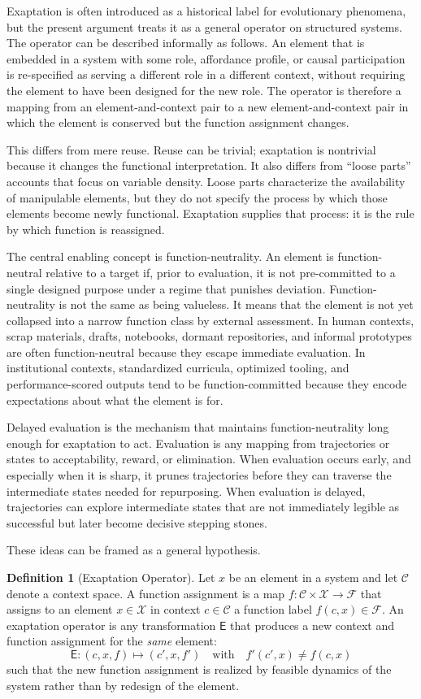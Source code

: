 \documentclass[11pt]{article}
\theoremstyle{definition}
\newtheorem{definition}{Definition}
\begin{document}
Exaptation is often introduced as a historical label for evolutionary phenomena, but the present argument treats it as a general operator on structured systems. The operator can be described informally as follows. An element that is embedded in a system with some role, affordance profile, or causal participation is re-specified as serving a different role in a different context, without requiring the element to have been designed for the new role. The operator is therefore a mapping from an element-and-context pair to a new element-and-context pair in which the element is conserved but the function assignment changes.

This differs from mere reuse. Reuse can be trivial; exaptation is nontrivial because it changes the functional interpretation. It also differs from ``loose parts'' accounts that focus on variable density. Loose parts characterize the availability of manipulable elements, but they do not specify the process by which those elements become newly functional. Exaptation supplies that process: it is the rule by which function is reassigned.

The central enabling concept is function-neutrality. An element is function-neutral relative to a target if, prior to evaluation, it is not pre-committed to a single designed purpose under a regime that punishes deviation. Function-neutrality is not the same as being valueless. It means that the element is not yet collapsed into a narrow function class by external assessment. In human contexts, scrap materials, drafts, notebooks, dormant repositories, and informal prototypes are often function-neutral because they escape immediate evaluation. In institutional contexts, standardized curricula, optimized tooling, and performance-scored outputs tend to be function-committed because they encode expectations about what the element is for.

Delayed evaluation is the mechanism that maintains function-neutrality long enough for exaptation to act. Evaluation is any mapping from trajectories or states to acceptability, reward, or elimination. When evaluation occurs early, and especially when it is sharp, it prunes trajectories before they can traverse the intermediate states needed for repurposing. When evaluation is delayed, trajectories can explore intermediate states that are not immediately legible as successful but later become decisive stepping stones.

These ideas can be framed as a general hypothesis.

\begin{definition}[Exaptation Operator]
Let $x$ be an element in a system and let $\mathcal{C}$ denote a context space. A function assignment is a map $f:\mathcal{C}\times \mathcal{X}\to \mathcal{F}$ that assigns to an element $x\in\mathcal{X}$ in context $c\in\mathcal{C}$ a function label $f(c,x)\in\mathcal{F}$. An exaptation operator is any transformation $\mathsf{E}$ that produces a new context and function assignment for the \emph{same} element:
\[
\mathsf{E}:(c,x,f)\mapsto (c',x,f') \quad \text{with} \quad f'(c',x)\neq f(c,x)
\]
such that the new function assignment is realized by feasible dynamics of the system rather than by redesign of the element.
\end{definition}
\end{document}
